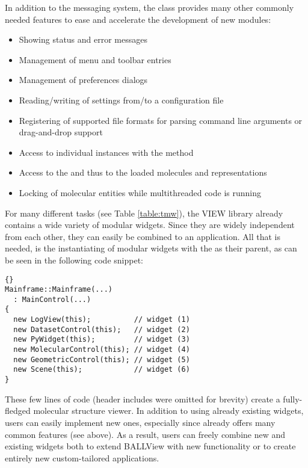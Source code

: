 In addition to the messaging system, the  class provides 
many other commonly needed features to ease and accelerate the development of
new modules:
\begin{itemize}
  \item Showing status and error messages
  \item Management of menu and toolbar entries 
  \item Management of preferences dialogs
  \item Reading/writing of settings from/to a configuration file
  \item Registering of supported file formats \eg for parsing command line
        arguments or drag-and-drop support
  \item Access to individual instances with the method 
  \item Access to the  and thus to the loaded molecules 
        and representations
  \item Locking of molecular entities while multithreaded code is running
\end{itemize}

For many different tasks (see Table \ref{table:tmw}), the VIEW library already 
contains a wide variety of modular widgets. Since they are widely independent 
from each other, they can easily be combined to an application. All that is 
needed, is the instantiating of modular widgets with the  
as their parent, as can be seen in the following code snippet:

\begin{lstlisting}{}
Mainframe::Mainframe(...)
  : MainControl(...)
{
  new LogView(this);          // widget (1)
  new DatasetControl(this);   // widget (2)
  new PyWidget(this);         // widget (3)
  new MolecularControl(this); // widget (4)
  new GeometricControl(this); // widget (5)
  new Scene(this);            // widget (6)
}
\end{lstlisting}

\noindent
These few lines of code (header includes were omitted for brevity) create a 
fully-fledged molecular structure viewer. In addition to using already 
existing widgets, users can easily implement new ones, especially since 
 already offers many common features (see above). As a 
result, users can freely combine new and existing widgets both to extend 
\mbox{BALLView} with new functionality or to create entirely new 
custom-tailored applications.

